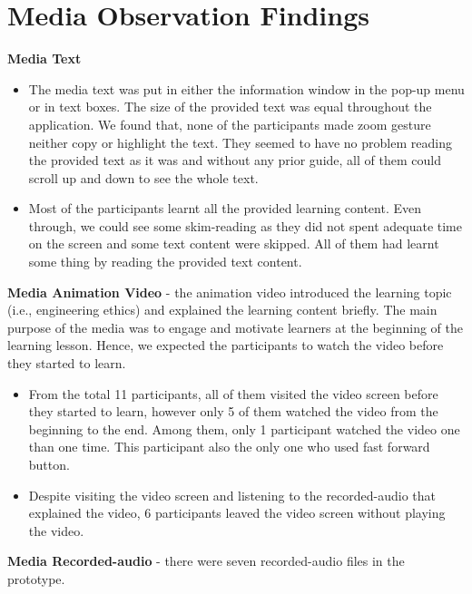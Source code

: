 

\section{Media Observation Findings} 
\noindent\textbf{Media Text} 
\begin{itemize}
\item The media text was put in either the information window in the pop-up menu or in text boxes. The size of the provided text was equal throughout the application. We found that, none of the participants made zoom gesture neither copy or highlight the text. They seemed to have no problem reading the provided text as it was and without any prior guide, all of them could scroll up and down to see the whole text. 

\item Most of the participants learnt all the provided learning content. Even through, we could see some skim-reading as they did not spent adequate time on the screen and some text content were skipped. All of them had learnt some thing by reading the provided text content. 
\end{itemize} 


\noindent\textbf{Media Animation Video} - the animation video introduced the learning topic (i.e., engineering ethics) and explained the learning content briefly. The main purpose of the media was to engage and motivate learners at the beginning of the learning lesson. Hence, we expected the participants to watch the video before they started to learn. 

\begin{itemize}
\item From the total 11 participants, all of them visited the video screen before they started to learn, however only 5 of them watched the video from the beginning to the end. Among them, only 1 participant watched the video one than one time. This participant also the only one who used fast forward button. 
\item Despite visiting the video screen and listening to the recorded-audio that explained the video, 6 participants leaved the video screen without playing the video. 
\end{itemize}



\noindent\textbf{Media Recorded-audio} - there were seven recorded-audio files in the prototype. 

